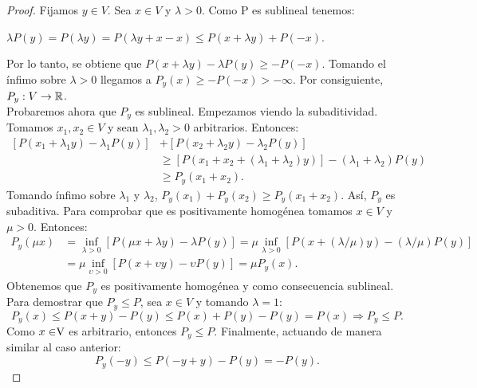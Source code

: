 	\begin{proof}
		Fijamos $ y \in V $. Sea $ x \in V $ y $ \lambda > 0$. Como P es sublineal tenemos: 
		\begin{center}
			$ \lambda P(y) = P(\lambda y) =P(\lambda y +x-x) \leq P(x+\lambda y)+ P(-x)$.
		\end{center}
		Por lo tanto, se obtiene que $ P(x+\lambda y) - \lambda P(y) \geq -P(-x) $.  Tomando el ínfimo sobre $ \lambda >0 $ llegamos a $ P_{y}(x)\geq -P(-x) > -\infty$. Por consiguiente, $ P_y:V \rightarrow \mathbb{R}$. \\
		
		Probaremos ahora que $ P_y $ es sublineal. Empezamos viendo la subaditividad. Tomamos $ x_1, x_2 \in V $ y sean $ \lambda_1, \lambda_2 > 0$ arbitrarios. Entonces: 
		\begin{equation*}
		\begin{split}
		\left[ P(x_1 + \lambda_1 y) - \lambda_1 P(y) \right] &+ \left[ P(x_2 + \lambda_2 y) - \lambda_2 P(y) \right] \\
		& \geq \left[ P(x_1 + x_2 + (\lambda_1+\lambda_2)y) \right] - (\lambda_1+\lambda_2) P(y) \\
		&\geq P_y (x_1 + x_2 ).
		\end{split}
		\end{equation*}
		Tomando ínfimo sobre $ \lambda_1 $ y $ \lambda_2 $, $  P_y (x_1)  + P_y (x_2 ) \geq P_y (x_1 + x_2 ) $. Así, $ P_y $ es subaditiva. Para comprobar que es positivamente homogénea tomamos $ x \in V $ y $ \mu > 0 $. Entonces:
		\begin{equation*}
		\begin{split}
		P_y (\mu x) &= \inf_{\lambda > 0} \left[P(\mu x+\lambda y) - \lambda P(y)\right] = \mu \inf_{\lambda > 0} \left[P(x+ (\lambda / \mu) y) - (\lambda / \mu) P(y)\right] \\
		&= \mu \inf_{\upsilon > 0} \left[P(x+ \upsilon y) - \upsilon  P(y)\right] = \mu P_y (x).
		\end{split}
		\end{equation*}	
		Obtenemos que $ P_y $ es positivamente homogénea y como consecuencia sublineal. \\
		
		Para demostrar que $ P_y \leq P $, sea $ x \in V $ y tomando $ \lambda = 1 $: 
		\[ P_y(x) \leq P(x+y) - P(y) \leq P(x)+ P(y) - P(y) = P(x) \Longrightarrow P_y \leq P.  \]
		Como $ x \in \vecSpace $ es arbitrario, entonces $ P_y \leq P $. Finalmente, actuando de manera similar al caso anterior:
		\[P_y(-y) \leq P(-y+y) - P(y) = -P(y).  \]
		
	\end{proof}
